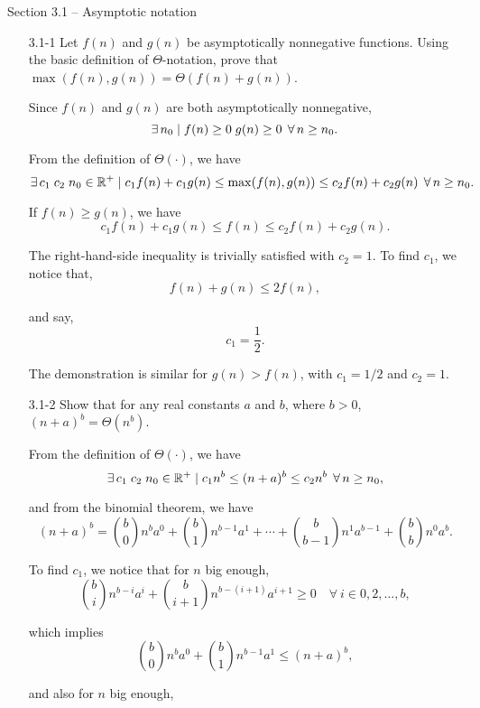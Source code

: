
{\large Section 3.1 {--} Asymptotic notation}

\begin{enumerate}

\item[3.1{-}1]{Let $f(n)$ and $g(n)$ be asymptotically nonnegative functions.
  Using the basic definition of $\Theta$-notation, prove that
  $\max(f(n), g(n)) = \Theta(f(n) + g(n))$.}

\begin{framed}
Since $f(n)$ and $g(n)$ are both asymptotically nonnegative,
\[
\operatorname{\exists} n_0 \mid f(n) \ge 0\;g(n) \ge 0\;\operatorname{\forall} n \ge n_0.
\]

From the definition of $\Theta(\cdot)$, we have
\[
\operatorname{\exists} c_1\;c_2\;n_0\in\mathbb{R}^+ \mid
c_1 f(n) + c_1 g(n) \le \max(f(n), g(n)) \le c_2 f(n) + c_2 g(n)\;
\operatorname{\forall} n \ge n_0.
\]

If $f(n) \ge g(n)$, we have
\[
c_1 f(n) + c_1 g(n) \le f(n) \le c_2 f(n) + c_2 g(n).
\]


The right-hand-side inequality is trivially satisfied with $c_2 = 1$. To find
\(c_1\), we notice that,
\[
f(n) + g(n) \le 2f(n),
\]

and say,
\[
c_1 = \frac{1}{2}.
\]

The demonstration is similar for $g(n) > f(n)$, with $c_1 = 1/2$ and $c_2 = 1$.
\end{framed}

\item[3.1{-}2]{Show that for any real constants $a$ and $b$, where
$b > 0$, $(n + a)^b = \Theta(n^b)$.}

\begin{framed}
From the definition of \(\Theta(\cdot)\), we have
\[
\operatorname{\exists} c_1\;c_2\;n_0\in\mathbb{R}^+ \mid c_1 n^b \leq (n+a)^b \leq c_2 n^b\;
\operatorname{\forall} n \ge n_0,
\]

and from the binomial theorem, we have
\[
(n + a)^b = \binom{b}{0} n^b a^0 + \binom{b}{1} n^{b - 1} a^1 + \cdots +
            \binom{b}{b - 1} n^1 a^{b - 1} + \binom{b}{b} n^0 a^b.
\]

To find \(c_1\), we notice that for $n$ big enough,
\[
\binom{b}{i} n^{b - i} a^i + \binom{b}{i + 1} n^{b - (i + 1)} a^{i + 1} \ge 0
\quad \forall\ i \in 0, 2, \dots ,b,
\]

which implies
\[
\binom{b}{0} n^b a^0 + \binom{b}{1} n^{b - 1} a^1 \le (n + a)^b,
\]

and also for $n$ big enough,


\end{framed}
\end{enumerate}
